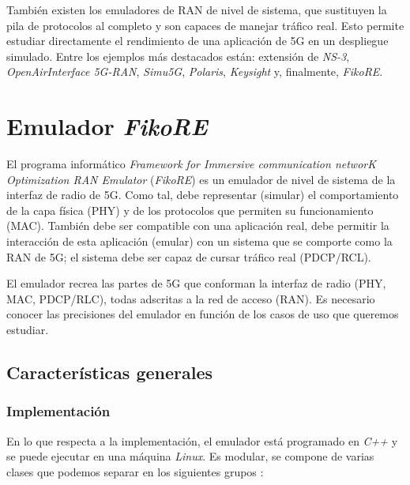 \documentclass[12pt]{report} %
\begin{document}
También existen los emuladores de RAN de nivel de sistema,
que sustituyen la pila de protocolos al completo y son capaces de manejar tráfico real.
Esto permite estudiar directamente el rendimiento de una aplicación de 5G en un despliegue simulado.
Entre los ejemplos más destacados están: extensión de \textit{NS-3}, \textit{OpenAirInterface 5G-RAN}, \textit{Simu5G}, \textit{Polaris}, \textit{Keysight} y, finalmente, \textit{FikoRE}.
\cite{RefWorks:3, RefWorks:5}

\chapter{Emulador \textit{FikoRE}}

El programa informático \textit{Framework for Immersive communication networK Optimization RAN Emulator} (\textit{FikoRE}) es un emulador de nivel de sistema de la interfaz de radio de 5G.
Como tal, debe representar (simular) el comportamiento de la capa física (PHY) y de los protocolos que permiten su funcionamiento (MAC).
También debe ser compatible con una aplicación real, debe permitir la interacción de esta aplicación (emular) con un sistema que se comporte como la RAN de 5G;
el sistema debe ser capaz de cursar tráfico real (PDCP/RCL). \cite{RefWorks:5, RefWorks:3, RefWorks:7}

El emulador recrea las partes de 5G que conforman la interfaz de radio (PHY, MAC, PDCP/RLC), todas adscritas a la red de acceso (RAN).
Es necesario conocer las precisiones del emulador en función de los casos de uso que queremos estudiar.

\section{Características generales}

\subsection{Implementación}

En lo que respecta a la implementación, el emulador está programado en \textit{C++} y se puede ejecutar en una máquina \textit{Linux}. \cite{RefWorks:5, RefWorks:3, RefWorks:7}
Es modular, se compone de varias clases que podemos separar en los siguientes grupos \cite{RefWorks:5, RefWorks:3, RefWorks:7, RefWorks:100}:
\end{document}

